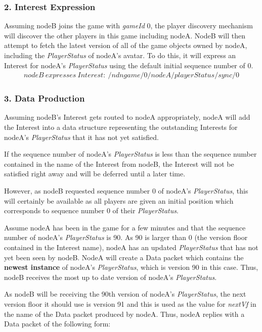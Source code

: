 \subsubsection{2. Interest Expression}
Assuming nodeB joins the game with \textit{gameId} 0, the player discovery mechanism will discover the other players in this game including nodeA. NodeB will then attempt to fetch the latest version of all of the game objects owned by nodeA, including the \textit{PlayerStatus} of nodeA's avatar. To do this, it will express an Interest for nodeA's \textit{PlayerStatus} using the default initial sequence number of 0.
\begin{align*}
    nodeB\ expresses\ Interest:\ /ndngame/0/nodeA/playerStatus/sync/0
\end{align*}

\subsubsection{3. Data Production}
Assuming nodeB's Interest gets routed to nodeA appropriately, nodeA will add the Interest into a data structure representing the outstanding Interests for nodeA's \textit{PlayerStatus} that it has not yet satisfied.

If the sequence number of nodeA's \textit{PlayerStatus} is less than the sequence number contained in the name of the Interest from nodeB, the Interest will not be satisfied right away and will be deferred until a later time.

However, as nodeB requested sequence number 0 of nodeA's \textit{PlayerStatus}, this will certainly be available as all players are given an initial position which corresponds to sequence number 0 of their \textit{PlayerStatus}.

Assume nodeA has been in the game for a few minutes and that the sequence number of nodeA's \textit{PlayerStatus} is 90. As 90 is larger than 0 (the version floor contained in the Interest name), nodeA has an updated \textit{PlayerStatus} that has not yet been seen by nodeB. NodeA will create a Data packet which contains the \textbf{newest instance} of nodeA's \textit{PlayerStatus}, which is version 90 in this case. Thus, nodeB receives the most up to date version of nodeA's \textit{PlayerStatus}.

As nodeB will be receiving the 90th version of nodeA's \textit{PlayerStatus}, the next version floor it should use is version 91 and this is used as the value for \textit{nextVf} in the name of the Data packet produced by nodeA. Thus, nodeA replies with a Data packet of the following form:

